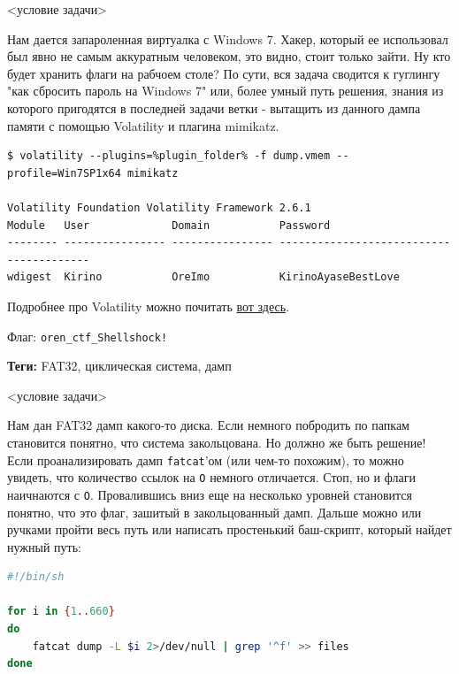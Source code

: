 \documentclass[idxtotoc,hyperref,openany,oneside]{files/forensics} %
\begin{document}
\begin{tcolorbox}
<условие задачи>
\end{tcolorbox}

Нам дается запароленная виртуалка с Windows 7. Хакер, который ее использовал был явно не самым аккуратным человеком, это видно, стоит только зайти. Ну кто будет хранить флаги на рабчоем столе? По сути, вся задача сводится к гуглингу "как сбросить пароль на Windows 7" или, более умный путь решения, знания из которого пригодятся в последней задачи ветки - вытащить из данного дампа памяти с помощью Volatility и плагина mimikatz.

\begin{verbatim}
$ volatility --plugins=%plugin_folder% -f dump.vmem --profile=Win7SP1x64 mimikatz

Volatility Foundation Volatility Framework 2.6.1
Module   User             Domain           Password
-------- ---------------- ---------------- ----------------------------------------
wdigest  Kirino           OreImo           KirinoAyaseBestLove
\end{verbatim}

Подробнее про Volatility можно почитать \href{https://habr.com/ru/post/433248/}{вот здесь}.

Флаг: \verb|oren_ctf_Shellshock!|




\textbf{Теги:} FAT32, циклическая система, дамп\vspace{\baselineskip}

\begin{tcolorbox}
<условие задачи>
\end{tcolorbox}

Нам дан FAT32 дамп какого-то диска. Если немного побродить по папкам становится понятно, что система закольцована. Но должно же быть решение! Если проанализировать дамп \verb|fatcat|'ом (или чем-то похожим), то можно увидеть, что количество ссылок на \verb|O| немного отличается. Стоп, но и флаги наичнаются с \verb|O|. Провалившись вниз еще на несколько уровней становится понятно, что это флаг, зашитый в закольцованный дамп. Дальше можно или ручками пройти весь путь или написать простенький баш-скрипт, который найдет нужный путь:
\begin{lstlisting}[language=Bash]
#!/bin/sh

for i in {1..660}
do
    fatcat dump -L $i 2>/dev/null | grep '^f' >> files
done
\end{lstlisting}
\end{document}
